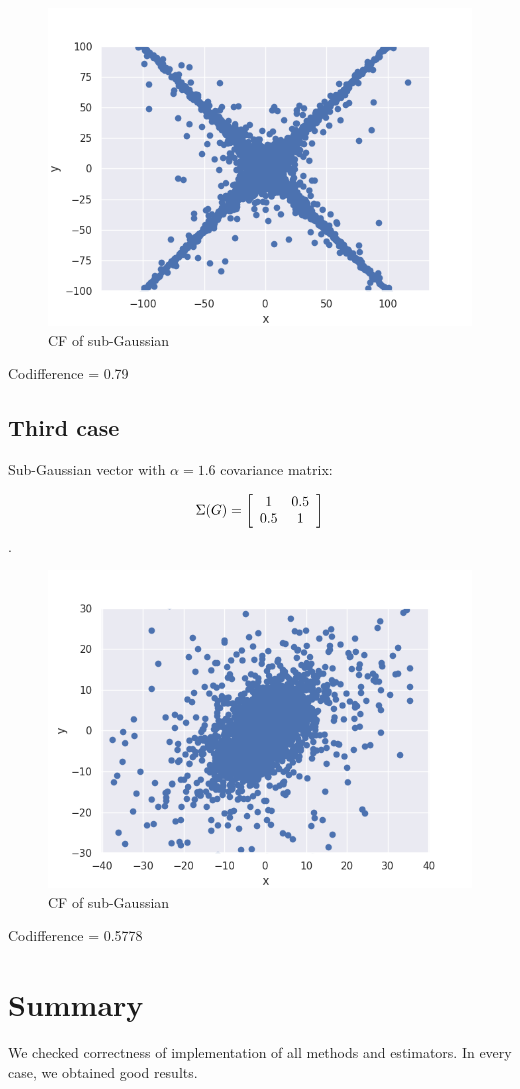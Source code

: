 \documentclass{article}
\begin{document}
	\begin{figure}[H]
		\centering
		\includegraphics[width=1\linewidth]{images/ex_5_2_alpha_stable_vector_simulation_discreet_scatter}
		\caption{CF of sub-Gaussian}\label{14}
	\end{figure}
	
	Codifference = 0.79
	
	\subsection{Third case}
	Sub-Gaussian vector with $\alpha =1.6$ covariance matrix:
	
	\[\Sigma(G) = \left[{\begin{array}{*{20}c}
			1 & 0.5\\
			0.5 & 1\end{array} } \right]\]. 
	
	\begin{figure}[H]
		\centering
		\includegraphics[width=1\linewidth]{images/ex_5_3_alpha_stable_vector_simulation_continuous_scatter}
		\caption{CF of sub-Gaussian}\label{15}
	\end{figure}
	
	Codifference = 0.5778
	
	
	
	\section{Summary}
	We checked correctness of implementation of all methods and estimators. In every case, we obtained good results.
	
\end{document}
